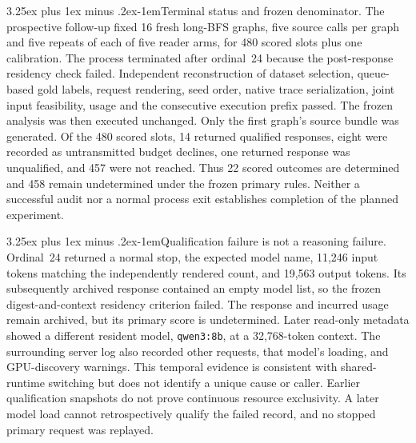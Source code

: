 \documentclass[10pt]{article}
\makeatletter
\renewcommand\paragraph{\@startsection{paragraph}{4}{\parindent}%
  {3.25ex plus 1ex minus .2ex}{-1em}{\normalfont\normalsize\bfseries}}
\makeatother
\begin{document}
\paragraph{Terminal status and frozen denominator.} The prospective follow-up fixed 16 fresh long-BFS graphs, five source calls per graph and five repeats of each of five reader arms, for 480 scored slots plus one calibration. The process terminated after ordinal~24 because the post-response residency check failed. Independent reconstruction of dataset selection, queue-based gold labels, request rendering, seed order, native trace serialization, joint input feasibility, usage and the consecutive execution prefix passed. The frozen analysis was then executed unchanged. Only the first graph's source bundle was generated. Of the 480 scored slots, 14 returned qualified responses, eight were recorded as untransmitted budget declines, one returned response was unqualified, and 457 were not reached. Thus 22 scored outcomes are determined and 458 remain undetermined under the frozen primary rules. Neither a successful audit nor a normal process exit establishes completion of the planned experiment.

\paragraph{Qualification failure is not a reasoning failure.} Ordinal~24 returned a normal stop, the expected model name, 11,246 input tokens matching the independently rendered count, and 19,563 output tokens. Its subsequently archived \protect{} response contained an empty model list, so the frozen digest-and-context residency criterion failed. The response and incurred usage remain archived, but its primary score is undetermined. Later read-only metadata showed a different resident model, \texttt{qwen3:8b}, at a 32,768-token context. The surrounding server log also recorded other \protect{} requests, that model's loading, and GPU-discovery warnings. This temporal evidence is consistent with shared-runtime switching but does not identify a unique cause or caller. Earlier qualification snapshots do not prove continuous resource exclusivity. A later model load cannot retrospectively qualify the failed record, and no stopped primary request was replayed.
\end{document}
